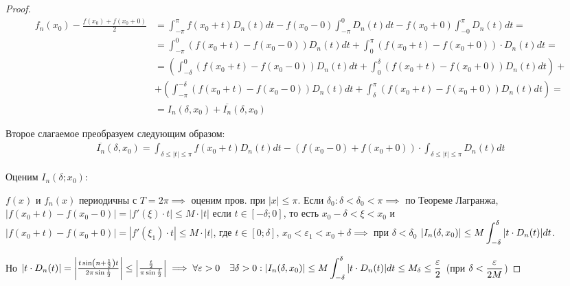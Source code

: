 \begin{proof}
    \begin{align*}
        f_n(x_0) - \frac{f(x_0) + f(x_0 + 0)}{2} &= 
        \int_{-\pi}^\pi f(x_0 + t) D_n(t) dt - 
        f(x_0 - 0) \int_{-\pi}^0 D_n(t) dt - f(x_0 + 0) \int_{-0}^\pi D_n(t) dt = \\
        &= \int_{-\pi}^0 (f(x_0 + t) - f(x_0 - 0)) D_n(t) dt +
        \int_0^\pi (f(x_0 + t) - f(x_0 + 0)) \cdot D_n(t) dt = \\
        &= \left( 
            \int_{-\delta}^0 (f(x_0 + t) - f(x_0 - 0)) D_n(t) dt +
            \int_0^\delta (f(x_0 + t) - f(x_0 + 0)) D_n(t) dt
        \right) + \\ &+ \left( 
            \int_{-\pi}^{-\delta} (f(x_0 + t) - f(x_0 - 0)) D_n(t) dt +
            \int_\delta^\pi (f(x_0 + t) - f(x_0 + 0)) D_n(t) dt
        \right) = \\
        &= I_n(\delta, x_0) + \overline{I_n}(\delta, x_0)
    \end{align*}
    
    Второе слагаемое преобразуем следующим образом:
    \begin{align*}
        \overline{I_n}(\delta, x_0) = \int_{\delta \leq |t| \leq \pi}
            f(x_0 + t) D_n(t) dt - (f(x_0 - 0) + f(x_0 + 0)) \cdot
            \int_{\delta \leq |t| \leq \pi} D_n(t) dt
    \end{align*}

    Оценим $I_n(\delta; x_0)$:

    $f(x)$ и $f_n(x)$ периодичны с $T = 2\pi \implies$ оценим пров. при 
    $|x| \leq \pi$. Если $\delta_0 : \delta < \delta_0 < \pi \implies$ по
    Теореме Лагранжа, $|f(x_0 + t) - f(x_0 - 0)| = |f'(\xi) \cdot t| 
    \leq M \cdot |t|$ если $t \in [-\delta; 0]$, то есть $x_0 - \delta < \xi < x_0$
    и $|f(x_0 + t) - f(x_0 + 0)| = |f'(\xi_1) \cdot t| \leq M \cdot |t|$, где
    $t \in [0; \delta], \, x_0 < \varepsilon_1 < x_0 + \delta \implies$ при
    $\delta < \delta_0$ $|I_n(\delta, x_0)| \leq M \displaystyle\int_{-\delta}^\delta
    |t \cdot D_n(t)| dt$.

    Но $|t \cdot D_n(t)| = \left| 
        \frac{t \sin \left( n + \frac{1}{2} \right) t}{2 \pi \sin \frac{t}{2}} \right|
    \leq \left| \frac{\frac{t}{2}}{\pi \sin \frac{t}{2}} \right| \implies
    \forall \varepsilon > 0 \quad \exists \delta > 0 : |I_n(\delta, x_0)| \leq
    M \displaystyle\int_{-\delta}^\delta |t \cdot D_n(t)| dt \leq M_\delta 
    \leq \frac{\varepsilon}{2}$ (при $\delta < \displaystyle\frac{\varepsilon}{2M}$)


\end{proof}
